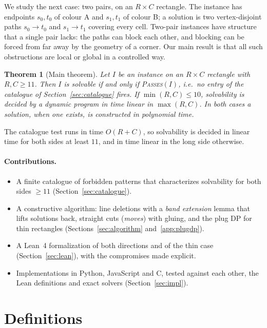 \documentclass[11pt]{article}
\newtheorem{theorem}{Theorem}
\newcommand{\pass}{\textup{\textsc{Passes}}\xspace}
\newcommand{\cA}{\textsf{A}\xspace}
\newcommand{\cB}{\textsf{B}\xspace}
\begin{document}
We study the next case: two pairs, on an $R \times C$ rectangle. The instance has endpoints
$s_0, t_0$ of colour \cA and $s_1, t_1$ of colour \cB; a solution is two vertex-disjoint paths
$s_0 \to t_0$ and $s_1 \to t_1$ covering every cell. Two-pair instances have structure that a
single pair lacks: the paths can block each other, and blocking can be forced from far away by the
geometry of a corner. Our main result is that all such obstructions are local or global in a
controlled way.

\begin{theorem}[Main theorem]\label{thm:main}
Let $I$ be an instance on an $R \times C$ rectangle with $R, C \ge 11$. Then $I$ is solvable if and
only if \pass$(I)$, i.e.\ no entry of the catalogue of Section~\ref{sec:catalogue} fires. If
$\min(R, C) \le 10$, solvability is decided by a dynamic program in time linear in $\max(R, C)$.
In both cases a solution, when one exists, is constructed in polynomial time.
\end{theorem}

The catalogue test runs in time $O(R + C)$, so solvability is decided in linear time for both
sides at least $11$, and in time linear in the long side otherwise.

\paragraph{Contributions.}
\begin{itemize}
\item A finite catalogue of forbidden patterns that characterizes solvability for both sides
  $\ge 11$ (Section~\ref{sec:catalogue}).
\item A constructive algorithm: line deletions with a \emph{band extension} lemma that lifts
  solutions back, straight cuts (\emph{moves}) with gluing, and the plug DP for thin rectangles
  (Sections~\ref{sec:algorithm} and~\ref{app:plugdp}).
\item A Lean~4 formalization of both directions and of the thin case
  (Section~\ref{sec:lean}), with the compromises made explicit.
\item Implementations in Python, JavaScript and C, tested against each other, the Lean
  definitions and exact solvers (Section~\ref{sec:impl}).
\end{itemize}

\section{Definitions}\label{sec:defs}
\end{document}
